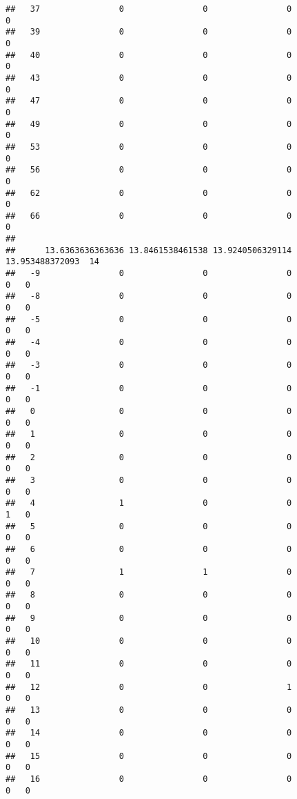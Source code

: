 \documentclass[]{article}
\begin{document}
\begin{verbatim}
##   37                0                0                0                0
##   39                0                0                0                0
##   40                0                0                0                0
##   43                0                0                0                0
##   47                0                0                0                0
##   49                0                0                0                0
##   53                0                0                0                0
##   56                0                0                0                0
##   62                0                0                0                0
##   66                0                0                0                0
##     
##      13.6363636363636 13.8461538461538 13.9240506329114 13.953488372093  14
##   -9                0                0                0               0   0
##   -8                0                0                0               0   0
##   -5                0                0                0               0   0
##   -4                0                0                0               0   0
##   -3                0                0                0               0   0
##   -1                0                0                0               0   0
##   0                 0                0                0               0   0
##   1                 0                0                0               0   0
##   2                 0                0                0               0   0
##   3                 0                0                0               0   0
##   4                 1                0                0               1   0
##   5                 0                0                0               0   0
##   6                 0                0                0               0   0
##   7                 1                1                0               0   0
##   8                 0                0                0               0   0
##   9                 0                0                0               0   0
##   10                0                0                0               0   0
##   11                0                0                0               0   0
##   12                0                0                1               0   0
##   13                0                0                0               0   0
##   14                0                0                0               0   0
##   15                0                0                0               0   0
##   16                0                0                0               0   0

\end{verbatim}
\end{document}
